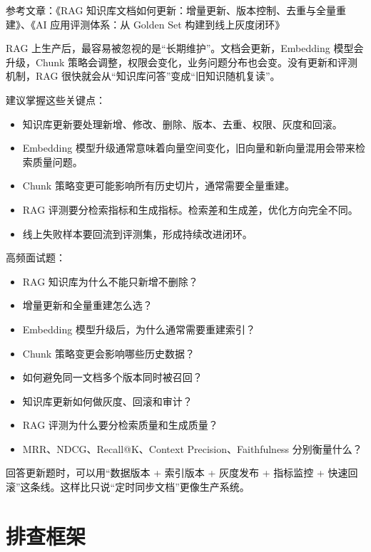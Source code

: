 \documentclass[9pt,a4paper,twocolumn]{ctexart}
\begin{document}
参考文章：《RAG 知识库文档如何更新：增量更新、版本控制、去重与全量重建》、《AI 应用评测体系：从 Golden Set 构建到线上灰度闭环》



RAG 上生产后，最容易被忽视的是“长期维护”。文档会更新，Embedding 模型会升级，Chunk 策略会调整，权限会变化，业务问题分布也会变。没有更新和评测机制，RAG 很快就会从“知识库问答”变成“旧知识随机复读”。



建议掌握这些关键点：


\begin{itemize}[itemsep=1pt, topsep=2pt]
  \item 知识库更新要处理新增、修改、删除、版本、去重、权限、灰度和回滚。
  \item Embedding 模型升级通常意味着向量空间变化，旧向量和新向量混用会带来检索质量问题。
  \item Chunk 策略变更可能影响所有历史切片，通常需要全量重建。
  \item RAG 评测要分检索指标和生成指标。检索差和生成差，优化方向完全不同。
  \item 线上失败样本要回流到评测集，形成持续改进闭环。
\end{itemize}


高频面试题：


\begin{itemize}[itemsep=1pt, topsep=2pt]
  \item RAG 知识库为什么不能只新增不删除？
  \item 增量更新和全量重建怎么选？
  \item Embedding 模型升级后，为什么通常需要重建索引？
  \item Chunk 策略变更会影响哪些历史数据？
  \item 如何避免同一文档多个版本同时被召回？
  \item 知识库更新如何做灰度、回滚和审计？
  \item RAG 评测为什么要分检索质量和生成质量？
  \item MRR、NDCG、Recall@K、Context Precision、Faithfulness 分别衡量什么？
\end{itemize}


回答更新题时，可以用“数据版本 + 索引版本 + 灰度发布 + 指标监控 + 快速回滚”这条线。这样比只说“定时同步文档”更像生产系统。



\section*{排查框架}
\end{document}
